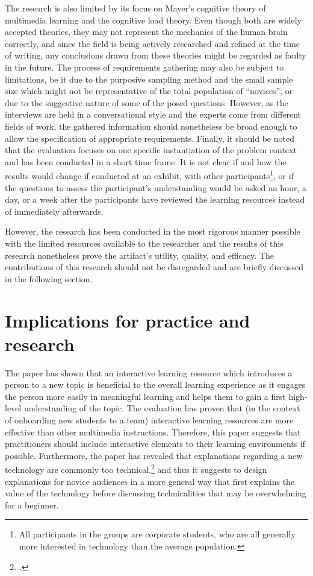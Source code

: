 The research is also limited by its focus on Mayer's cognitive theory of multimedia learning and the cognitive load theory. Even though both are widely accepted theories, they may not represent the mechanics of the human brain correctly, and since the field is being actively researched and refined at the time of writing, any conclusions drawn from these theories might be regarded as faulty in the future. The process of requirements gathering may also be subject to limitations, be it due to the purposive sampling method and the small sample size which might not be representative of the total population of \enquote{novices}, or due to the suggestive nature of some of the posed questions. However, as the interviews are held in a conversational style and the experts come from different fields of work, the gathered information should nonetheless be broad enough to allow the specification of appropriate requirements. Finally, it should be noted that the evaluation focuses on one specific instantiation of the problem context and has been conducted in a short time frame. It is not clear if and how the results would change if conducted at an exhibit, with other participants\footnote{All participants in the groups are corporate students, who are all generally more interested in technology than the average population.}, or if the questions to assess the participant's understanding would be asked an hour, a day, or a week after the participants have reviewed the learning resources instead of immediately afterwards.

However, the research has been conducted in the most rigorous manner possible with the limited resources available to the researcher and the results of this research nonetheless prove the artifact's utility, quality, and efficacy. The contributions of this research should not be disregarded and are briefly discussed in the following section. 

\section{Implications for practice and research} \label{Implications}
The paper has shown that an interactive learning resource which introduces a person to a new topic is beneficial to the overall learning experience as it engages the person more easily in meaningful learning and helps them to gain a first high-level understanding of the topic. The evaluation has proven that (in the context of onboarding new students to a team) interactive learning resources are more effective than other multimedia instructions. Therefore, this paper suggests that practitioners should include interactive elements to their learning environments if possible. Furthermore, the paper has revealed that explanations regarding a new technology are commonly too technical.\footcite[Cf.][]{DanielKaltenbach_Interview} and thus it suggests to design explanations for novice audiences in a more general way that first explains the value of the technology before discussing technicalities that may be overwhelming for a beginner.

